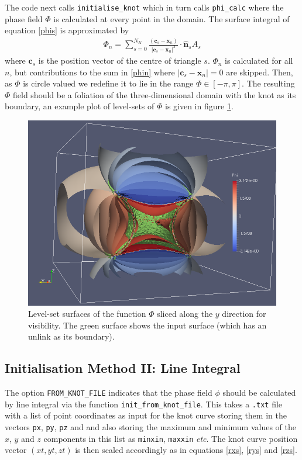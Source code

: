 \documentclass[notitlepage,aps,amsmath,amssymb,11pt]{revtex4-1}
\newcommand{\norm}[1]{\left| #1 \right|}
\renewcommand{\vec}[1]{\boldsymbol{#1}}
\begin{document}
The code next calls \verb'initialise_knot' which in turn calls \verb'phi_calc' where the phase field $\Phi$ is calculated at every point in the domain. The surface integral of equation \eqref{phis} is approximated by 
\begin{align}
\label{phin} \Phi_{n} = \sum_{s=0}^{N_K}  \frac{(\vec{c}_s - \vec{x}_{n})}{\norm{\vec{c}_s - \vec{x}_{n}}^3}\cdot \hat{\vec{n}}_s A_s
\end{align}
where $\vec{c}_s$ is the position vector of the centre of triangle $s$. $\Phi_n$ is calculated for all $n$, but contributions to the sum in \eqref{phin} where $\norm{\vec{c}_s - \vec{x}_{n}} = 0$ are skipped. Then, as $\Phi$ is circle valued we redefine it to lie in the range $\Phi \in [-\pi,\pi]$. The resulting $\Phi$ field should be a foliation of the three-dimensional domain with the knot as its boundary, an example plot of level-sets of $\Phi$ is given in figure \ref{fig:phi}.
\begin{figure}[h!]
\centering
\includegraphics[width=0.8\columnwidth]{phi.png}
\caption{Level-set surfaces of the function $\Phi$ sliced along the $y$ direction for visibility. The green surface shows the input surface (which has an unlink as its boundary). }
\label{fig:phi}
\end{figure}

\subsection{Initialisation Method II: Line Integral}

The option \verb'FROM_KNOT_FILE' indicates that the phase field $\phi$ should be calculated by line integral via the function \verb'init_from_knot_file'. This takes a \verb'.txt' file with a list of point coordinates as input for the knot curve storing them in the vectors \verb'px', \verb'py', \verb'pz' and and also storing the maximum and minimum values of the $x$, $y$ and $z$ components in this list as \verb'minxin', \verb'maxxin' \emph{etc}. The knot curve position vector $(xt,yt,zt)$ is then scaled accordingly as in equations \eqref{rxs}, \eqref{rys} and \eqref{rzs}.
\end{document}
